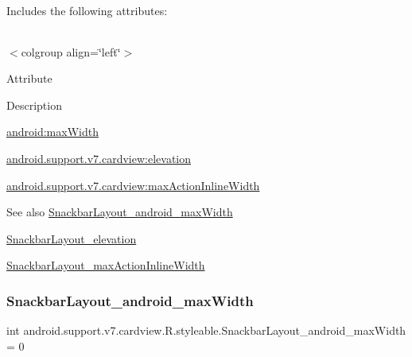 Includes the following attributes\+:

\tabulinesep=1mm
\begin{longtabu} spread 0pt [c]{*{0}{|X[-1]}|}
\hline
\end{longtabu}
$<$colgroup align=\char`\"{}left\char`\"{}$>$ 

Attribute

Description 

{\ttfamily \hyperlink{classandroid_1_1support_1_1v7_1_1cardview_1_1R_1_1styleable_a905053a7c2becdfc55ac2369107505e1}{android\+:max\+Width}}

{\ttfamily \hyperlink{classandroid_1_1support_1_1v7_1_1cardview_1_1R_1_1styleable_a964a1df1d1968a300ceb9add6dd8ee9a}{android.\+support.\+v7.\+cardview\+:elevation}}

{\ttfamily \hyperlink{classandroid_1_1support_1_1v7_1_1cardview_1_1R_1_1styleable_a9640f431c4f2b457dc8b393e43e89ba9}{android.\+support.\+v7.\+cardview\+:max\+Action\+Inline\+Width}}

\begin{DoxySeeAlso}{See also}
\hyperlink{classandroid_1_1support_1_1v7_1_1cardview_1_1R_1_1styleable_a905053a7c2becdfc55ac2369107505e1}{Snackbar\+Layout\+\_\+android\+\_\+max\+Width} 

\hyperlink{classandroid_1_1support_1_1v7_1_1cardview_1_1R_1_1styleable_a964a1df1d1968a300ceb9add6dd8ee9a}{Snackbar\+Layout\+\_\+elevation} 

\hyperlink{classandroid_1_1support_1_1v7_1_1cardview_1_1R_1_1styleable_a9640f431c4f2b457dc8b393e43e89ba9}{Snackbar\+Layout\+\_\+max\+Action\+Inline\+Width} 
\end{DoxySeeAlso}
\mbox{\label{classandroid_1_1support_1_1v7_1_1cardview_1_1R_1_1styleable_a905053a7c2becdfc55ac2369107505e1}} 
\subsubsection{\texorpdfstring{Snackbar\+Layout\+\_\+android\+\_\+max\+Width}{SnackbarLayout\_android\_maxWidth}}
{\footnotesize\ttfamily int android.\+support.\+v7.\+cardview.\+R.\+styleable.\+Snackbar\+Layout\+\_\+android\+\_\+max\+Width = 0\hspace{0.3cm}{\ttfamily [static]}}


